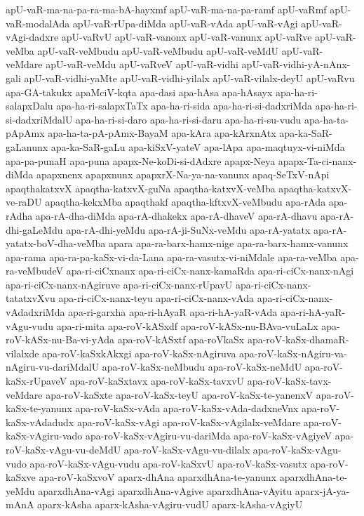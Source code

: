 {apU-vaR-ma-na-pa-ra-ma-bA-hayxmf
apU-vaR-ma-na-pa-ramf
apU-vaRmf
apU-vaR-modalAda
apU-vaR-rUpa-diMda
apU-vaR-vAda
apU-vaR-vAgi
apU-vaR-vAgi-dadxre
apU-vaRvU
apU-vaR-vanonx
apU-vaR-vanunx
apU-vaRve
apU-vaR-veMba
apU-vaR-veMbudu
apU-vaR-veMbudu
apU-vaR-veMdU
apU-vaR-veMdare
apU-vaR-veMdu
apU-vaRveV
apU-vaR-vidhi
apU-vaR-vidhi-yA-nAnx-gali
apU-vaR-vidhi-yaMte
apU-vaR-vidhi-yilalx
apU-vaR-vilalx-deyU
apU-vaRvu
apa-GA-takukx
apaMciV-kqta
apa-dasi
apa-hAsa
apa-hAsayx
apa-ha-ri-salapxDalu
apa-ha-ri-salapxTaTx
apa-ha-ri-sida
apa-ha-ri-si-dadxriMda
apa-ha-ri-si-dadxriMdalU
apa-ha-ri-si-daro
apa-ha-ri-si-daru
apa-ha-ri-su-vudu
apa-ha-ta-pApAmx
apa-ha-ta-pA-pAmx-BayaM
apa-kAra
apa-kArxnAtx
apa-ka-SaR-gaLanunx
apa-ka-SaR-gaLu
apa-kiSxV-yateV
apa-lApa
apa-maqtuyx-vi-niMda
apa-pa-punaH
apa-puna
apapx-Ne-koDi-si-dAdxre
apapx-Neya
apapx-Ta-ci-nanx-diMda
apapxnenx
apapxnunx
apapxrX-Na-ya-na-vanunx
apaq-SeTxV-nApi
apaqthakatxvX
apaqtha-katxvX-guNa
apaqtha-katxvX-veMba
apaqtha-katxvX-ve-raDU
apaqtha-kekxMba
apaqthakf
apaqtha-kftxvX-veMbudu
apa-rAda
apa-rAdha
apa-rA-dha-diMda
apa-rA-dhakekx
apa-rA-dhaveV
apa-rA-dhavu
apa-rA-dhi-gaLeMdu
apa-rA-dhi-yeMdu
apa-rA-ji-SuNx-veMdu
apa-rA-yatatx
apa-rA-yatatx-boV-dha-veMba
apara
apa-ra-barx-hamx-nige
apa-ra-barx-hamx-vanunx
apa-rama
apa-ra-pa-kaSx-vi-da-Lana
apa-ra-vasutx-vi-niMdale
apa-ra-veMba
apa-ra-veMbudeV
apa-ri-ciCxnanx
apa-ri-ciCx-nanx-kamaRda
apa-ri-ciCx-nanx-nAgi
apa-ri-ciCx-nanx-nAgiruve
apa-ri-ciCx-nanx-rUpavU
apa-ri-ciCx-nanx-tatatxvXvu
apa-ri-ciCx-nanx-teyu
apa-ri-ciCx-nanx-vAda
apa-ri-ciCx-nanx-vAdadxriMda
apa-ri-garxha
apa-ri-hAyaR
apa-ri-hA-yaR-vAda
apa-ri-hA-yaR-vAgu-vudu
apa-ri-mita
apa-roV-kASxdf
apa-roV-kASx-nu-BAva-vuLaLx
apa-roV-kASx-nu-Ba-vi-yAda
apa-roV-kASxtf
apa-roVkaSx
apa-roV-kaSx-dhamaR-vilalxde
apa-roV-kaSxkAkxgi
apa-roV-kaSx-nAgiruva
apa-roV-kaSx-nAgiru-va-nAgiru-vu-dariMdalU
apa-roV-kaSx-neMbudu
apa-roV-kaSx-neMdU
apa-roV-kaSx-rUpaveV
apa-roV-kaSxtavx
apa-roV-kaSx-tavxvU
apa-roV-kaSx-tavx-veMdare
apa-roV-kaSxte
apa-roV-kaSx-teyU
apa-roV-kaSx-te-yanenxV
apa-roV-kaSx-te-yanunx
apa-roV-kaSx-vAda
apa-roV-kaSx-vAda-dadxneVnx
apa-roV-kaSx-vAdadudx
apa-roV-kaSx-vAgi
apa-roV-kaSx-vAgilalx-veMdare
apa-roV-kaSx-vAgiru-vado
apa-roV-kaSx-vAgiru-vu-dariMda
apa-roV-kaSx-vAgiyeV
apa-roV-kaSx-vAgu-vu-deMdU
apa-roV-kaSx-vAgu-vu-dilalx
apa-roV-kaSx-vAgu-vudo
apa-roV-kaSx-vAgu-vudu
apa-roV-kaSxvU
apa-roV-kaSx-vasutx
apa-roV-kaSxve
apa-roV-kaSxvoV
aparx-dhAna
aparxdhAna-te-yanunx
aparxdhAna-te-yeMdu
aparxdhAna-vAgi
aparxdhAna-vAgive
aparxdhAna-vAyitu
aparx-jA-ya-mAnA
aparx-kAsha
aparx-kAsha-vAgiru-vudU
aparx-kAsha-vAgiyU
}

